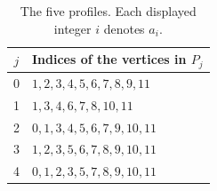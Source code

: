 \begin{table}[H]
\centering\small\setlength{\tabcolsep}{4pt}
\caption{The five profiles. Each displayed integer \(i\) denotes \(a_i\).}\label{6k6:tab:profiles}
\begin{tabular}{c l}\toprule
$j$ & Indices of the vertices in $P_j$\\\midrule
0 & \(1,2,3,4,5,6,7,8,9,11\)\\
1 & \(1,3,4,6,7,8,10,11\)\\
2 & \(0,1,3,4,5,6,7,9,10,11\)\\
3 & \(1,2,3,5,6,7,8,9,10,11\)\\
4 & \(0,1,2,3,5,7,8,9,10,11\)\\
\bottomrule\end{tabular}
\end{table}

